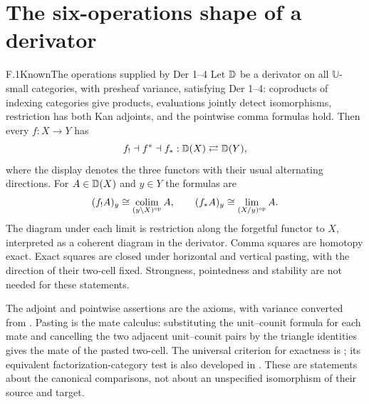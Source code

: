 \section{The six-operations shape of a derivator}

\begin{claim}{F.1}{Known}{The operations supplied by Der 1--4}
Let $\mathbb D$ be a derivator on all $\mathbb U$-small categories, with presheaf variance, satisfying Der 1--4: coproducts of indexing categories give products, evaluations jointly detect isomorphisms, restriction has both Kan adjoints, and the pointwise comma formulas hold. Then every $f:X\to Y$ has
\[
 f_!\dashv f^*\dashv f_*:\mathbb D(X)\rightleftarrows\mathbb D(Y),
\]
where the display denotes the three functors with their usual alternating directions. For $A\in\mathbb D(X)$ and $y\in Y$ the formulas are
\[
 (f_!A)_y\cong\mathop{\mathrm{colim}}_{(y\backslash X)^{\mathrm{op}}} A,
 \qquad
 (f_*A)_y\cong\lim_{(X/y)^{\mathrm{op}}} A.
\]
The diagram under each limit is restriction along the forgetful functor to $X$, interpreted as a coherent diagram in the derivator. Comma squares are homotopy exact. Exact squares are closed under horizontal and vertical pasting, with the direction of their two-cell fixed. Strongness, pointedness and stability are not needed for these statements.
\end{claim}
The adjoint and pointwise assertions are the axioms, with variance converted from \citet[Definition 1.5 and Section 1.2]{EFGroth2013}. Pasting is the mate calculus: substituting the unit--counit formula for each mate and cancelling the two adjacent unit--counit pairs by the triangle identities gives the mate of the pasted two-cell. The universal criterion for exactness is \citet[Theorem 3.16]{EFGPS2014a}; its equivalent factorization-category test is also developed in \citet[Section 2]{EFMaltsiniotis2012}. These are statements about the canonical comparisons, not about an unspecified isomorphism of their source and target.

